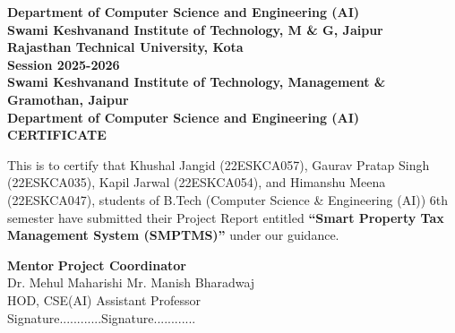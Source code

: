 \begin{center}
\vspace{2cm}
\large{\textbf{Department of Computer Science and Engineering (AI)}}\\
\large{\textbf{Swami Keshvanand Institute of Technology, M \& G, Jaipur}}\\
\large{\textbf{Rajasthan Technical University, Kota}}
\large{\textbf{\\Session 2025-2026}}\\
\newpage
\LARGE{\textbf{Swami Keshvanand Institute of Technology, Management \& Gramothan, Jaipur}} \\ 
\large{\textbf{Department of Computer Science and Engineering (AI)}}\\
\linespread{1.13}
\vspace{1 cm}
{\Huge \textbf{CERTIFICATE}}\\[0.5cm]
\end{center}
\vspace{2 cm}
\linespread{1.6}
\large{This is to certify that Khushal Jangid (22ESKCA057), Gaurav Pratap Singh (22ESKCA035), Kapil Jarwal (22ESKCA054), and Himanshu Meena (22ESKCA047), students of B.Tech (Computer Science \& Engineering (AI)) 6th semester have submitted their Project Report entitled \textbf{``Smart Property Tax Management System (SMPTMS)''} under our guidance.}
\vspace{2 cm}
\linespread{1.6}
\begin{flushright}
\textbf{Mentor} \hfill \textbf{Project Coordinator}\\
Dr. Mehul Maharishi \hfill Mr. Manish Bharadwaj\\
HOD, CSE(AI) \hfill Assistant Professor\\
Signature............\hfill Signature............
\end{flushright}
